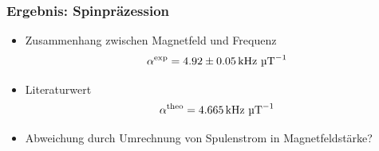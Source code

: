 \begin{frame}
\frametitle{Ergebnis: Spinpräzession}
\begin{itemize}
    \item Zusammenhang zwischen Magnetfeld und Frequenz
    \begin{equation*}
        \alpha^\text{exp} = 4.92 \pm 0.05\,\text{kHz } \text{\textmu T}^{-1}
    \end{equation*}
    \item Literaturwert
    \begin{equation*}
        \alpha^\text{theo} = 4.665\,\text{kHz } \text{\textmu T}^{-1}
    \end{equation*}
    \item Abweichung durch Umrechnung von Spulenstrom in Magnetfeldstärke?
\end{itemize}
  
\end{frame}
